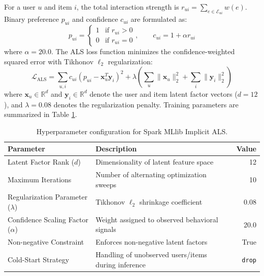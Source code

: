 \documentclass[10pt,a4paper,twoside]{article}
\begin{document}
For a user $u$ and item $i$, the total interaction strength is $r_{ui} = \sum_{e \in \mathcal{E}_{ui}} w(e)$. Binary preference $p_{ui}$ and confidence $c_{ui}$ are formulated as:
\begin{equation}
p_{ui} = \begin{cases} 1 & \text{if } r_{ui} > 0 \\ 0 & \text{if } r_{ui} = 0 \end{cases}, \qquad c_{ui} = 1 + \alpha r_{ui}
\end{equation}
where $\alpha = 20.0$. The ALS loss function minimizes the confidence-weighted squared error with Tikhonov $\ell_2$ regularization:
\begin{equation}
\mathcal{L}_{\text{ALS}} = \sum_{u, i} c_{ui} \left( p_{ui} - \mathbf{x}_u^T \mathbf{y}_i \right)^2 + \lambda \left( \sum_u \|\mathbf{x}_u\|_2^2 + \sum_i \|\mathbf{y}_i\|_2^2 \right)
\end{equation}
where $\mathbf{x}_u \in \mathbb{R}^d$ and $\mathbf{y}_i \in \mathbb{R}^d$ denote the user and item latent factor vectors ($d = 12$), and $\lambda = 0.08$ denotes the regularization penalty. Training parameters are summarized in Table \ref{tab:als_config}.

\begin{table}[ht]
\centering
\small
\caption{Hyperparameter configuration for Spark MLlib Implicit ALS.}
\label{tab:als_config}
\begin{tabular}{llr}
\toprule
\textbf{Parameter} & \textbf{Description} & \textbf{Value} \\
\midrule
Latent Factor Rank ($d$) & Dimensionality of latent feature space & 12 \\
Maximum Iterations & Number of alternating optimization sweeps & 10 \\
Regularization Parameter ($\lambda$) & Tikhonov $\ell_2$ shrinkage coefficient & 0.08 \\
Confidence Scaling Factor ($\alpha$) & Weight assigned to observed behavioral signals & 20.0 \\
Non-negative Constraint & Enforces non-negative latent factors & True \\
Cold-Start Strategy & Handling of unobserved users/items during inference & \texttt{drop} \\
\bottomrule
\end{tabular}
\end{table}
\end{document}
